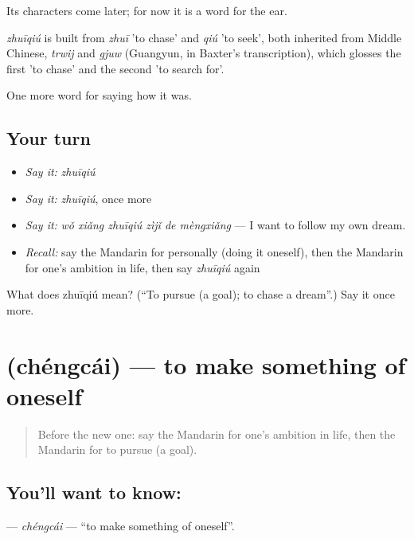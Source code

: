 Its characters come later; for now it is a word for the ear.

\begin{cousinweb}
\emph{zhuīqiú} is built from \emph{zhuī} 'to chase' and \emph{qiú} 'to seek', both inherited from Middle Chinese, \emph{trwij} and \emph{gjuw} (Guangyun, in Baxter's transcription), which glosses the first 'to chase' and the second 'to search for'.
\end{cousinweb}

\begin{grammarlens}[title={What you've built}]
One more word for saying how it was.
\end{grammarlens}

\subsection*{Your turn}
\begin{itemize}
\raggedright
  \item \emph{Say it:} \emph{zhuīqiú}
  \item \emph{Say it:} \emph{zhuīqiú}, once more
  \item \emph{Say it:} \emph{wǒ xiǎng zhuīqiú zìjǐ de mèngxiǎng} — I want to follow my own dream.
  \item \emph{Recall:} say the Mandarin for personally (doing it oneself), then the Mandarin for one's ambition in life, then say \emph{zhuīqiú} again
\end{itemize}

\begin{tcolorbox}[breakable,colback=teal!4,colframe=teal!35!black,title={Before you move on}]
What does zhuīqiú mean? (\textquotedblleft{}To pursue (a goal); to chase a dream\textquotedblright{}.) Say it once more.
\end{tcolorbox}
\section[\texorpdfstring{\zh{成才} (chéngcái)}{成才 (chéngcái)}]{ (chéngcái) — to make something of oneself}

\label{lesson:ZH-C512-chengcai}



\begin{quote}
Before the new one: say the Mandarin for one's ambition in life, then the Mandarin for to pursue (a goal).
\end{quote}

\subsection*{You'll want to know: }
\textbf{} — \emph{chéngcái} — \textquotedblleft{}to make something of oneself\textquotedblright{}.


